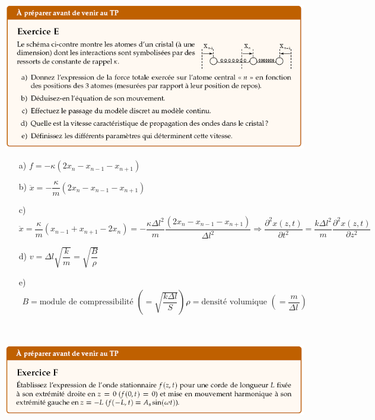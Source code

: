 \documentclass	[11pt, a4paper, openany]{book}
\begin{document}
		\begin{center}
			\includegraphics[scale=0.85]{prepa/Ondes-E.png}\\
		\end{center}
		
		\begin{itemize}
			\item[a) ]$f=-\kappa(2x_n-x_{n-1}-x_{n+1})$
			\item[b) ]$\ddot{x}=-\dfrac{\kappa}{m}(2x_n-x_{n-1}-x_{n+1})$
			      
			\item[c) ]$\ddot{x}=\dfrac{\kappa}{m}(x_{n-1}+x_{n+1}-2x_n)=-\dfrac{\kappa\Delta l^2}{m}\dfrac{(2x_n-x_{n-1}-x_{n+1})}{\Delta l^2}\Rightarrow\dfrac{\partial^2 x(z,t)}{\partial t^2}=\dfrac{k\Delta l^2}{m}\dfrac{\partial^2x(z,t)}{\partial z^2}$
			      
			\item[d) ]$v=\Delta l\sqrt{\dfrac{k}{m}}=\sqrt{\dfrac{B}{\rho}}$
			      
			\item[e) ]$\begin{array}{lr}
			      B=\text{module de compressibilité }\left(=\sqrt{\dfrac{k\Delta l}{S}}\right),  & \rho=\text{densité volumique }\left(=\dfrac{m}{\Delta l\,}\right)
			\end{array}$
		\end{itemize}
		\
		\begin{center}
			\includegraphics[scale=0.85]{prepa/Ondes-F.png}\\
		\end{center}
		
\end{document}
